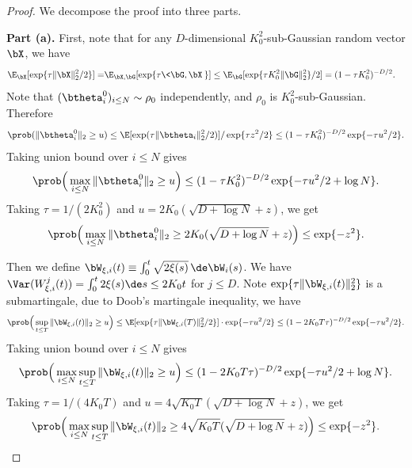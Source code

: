 \documentclass[11pt]{article}
\begin{document}
\begin{proof}We decompose the proof into three parts. 

\noindent
{\bf Part (a). } First, note that for any $D$-dimensional $K_0^2$-sub-Gaussian random vector $\bX$, we have 
\begin{equation}\label{eqn:moment_of_exp_sub_gaussian_square}
\begin{aligned}
\E_{\bX}[\exp\{ \tau \| \bX \|_2^2 /2 \}] =& \E_{\bX, \bG}[\exp\{ \tau\<\bG, \bX \> \}] \le \E_{\bG}[\exp\{ \tau K_0^2 \| \bG \|_2^2 \}/2] = (1 - \tau K_0^2)^{-D/2}. 
\end{aligned}
\end{equation}
Note that $(\btheta_i^0)_{i \le N} \sim \rho_0$ independently, and $\rho_0$ is $K_0^2$-sub-Gaussian. Therefore
\[
\begin{aligned}
\prob(\| \btheta_i^0 \|_2 \ge u) \le \E[\exp(\tau \| \btheta_i \|_2^2/2)] / \exp\{ \tau z^2/2 \} \le (1 - \tau K_0^2)^{-D/2} \exp \{ - \tau u^2/2 \}.
\end{aligned}
\]
Taking union bound over $i \le N$ gives
\[
\begin{aligned}
\prob\Big(\max_{i \le N}\| \btheta_i^0 \|_2 \ge u\Big) \le (1 - \tau K_0^2)^{-D/2} \exp\{ - \tau u^2/2 + \log N \}. 
\end{aligned}
\]
Taking $\tau = 1/(2 K_0^2)$ and $u = 2K_0 (\sqrt{D + \log N} + z)$, we get 
\begin{equation}\label{eqn:bound_for_Theta_in_finite_beta}
\begin{aligned}
\prob\Big(\max_{i \le N}\| \btheta_i^0 \|_2 \ge 2 K_0(\sqrt{D + \log N} + z) \Big) \le  \exp\{ - z^2 \}. 
\end{aligned}
\end{equation}

Then we define $\bW_{\xi, i}(t) \equiv \int_0^t \sqrt{2\xi(s)} \, \de \bW_i(s)$. We have $\Var(W_{\xi, i}^j(t)) = \int_0^t 2 \xi(s) \de s \le 2 K_0 t$ for $j \le D$. Note $\exp\{ \tau \| \bW_{\xi, i}(t)\|_2^2 \}$ is a submartingale, due to Doob's martingale inequality, we have
\[
\begin{aligned}
\prob\Big( \sup_{t \le T} \| \bW_{\xi, i}(t) \|_2 \ge u \Big) \le \E[ \exp\{ \tau \| \bW_{\xi, i}(T) \|_2^2/2 \} ] \cdot \exp\{ -\tau u^2/2 \} \le (1 - 2 K_0 T \tau )^{-D/2} \exp \{ - \tau u^2/2 \}. 
\end{aligned}
\]
Taking union bound over $i \le N$ gives
\[
\begin{aligned}
\prob\Big( \max_{i \le N}\sup_{t \le T} \| \bW_{\xi, i}(t) \|_2 \ge u \Big) \le (1 - 2 K_0 T \tau )^{-D/2} \exp \{ - \tau u^2/2 + \log N \}. 
\end{aligned}
\]
Taking $\tau = 1/(4 K_0 T)$ and $u = 4 \sqrt{K_0 T} (\sqrt{D + \log N} + z)$, we get 
\begin{equation}\label{eqn:bound_for_W_in_finite_beta}
\begin{aligned}
\prob\Big(\max_{i \le N}\sup_{t \le T} \| \bW_{\xi, i}(t) \|_2 \ge 4 \sqrt{K_0 T} (\sqrt{D + \log N} + z) \Big) \le  \exp\{ - z^2 \}. 
\end{aligned}
\end{equation}


\end{proof}
\end{document}
